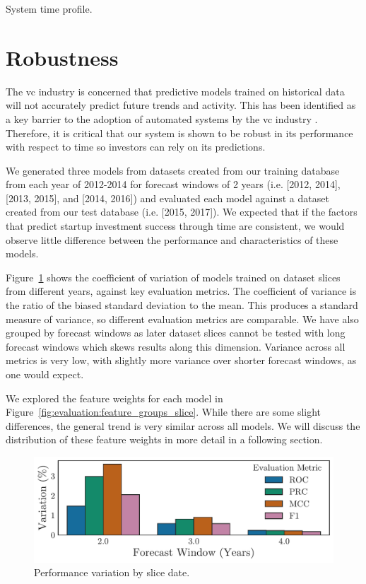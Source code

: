 \documentclass[../thesis/thesis.tex]{subfiles}
\begin{document}
\begin{table}[!htb]
    \centering
    \scalebox{0.9}{}
    \caption[System time profile]{System time profile.}
    \label{tab:evaluation:time_profile}
\end{table}

\section{Robustness}

The \gls{vc} industry is concerned that predictive models trained on historical data will not accurately predict future trends and activity. This  has been identified as a key barrier to the adoption of automated systems by the \gls{vc} industry \cite{stone2014}. Therefore, it is critical that our system is shown to be robust in its performance with respect to time so investors can rely on its predictions.

We generated three models from datasets created from our training database from each year of 2012-2014 for forecast windows of 2 years (i.e. [2012, 2014], [2013, 2015], and [2014, 2016]) and evaluated each model against a dataset created from our test database (i.e. [2015, 2017]). We expected that if the factors that predict startup investment success through time are consistent, we would observe little difference between the performance and characteristics of these models.

Figure~\ref{fig:evaluation:f1_robustness_slice} shows the coefficient of variation of models trained on dataset slices from different years, against key evaluation metrics. The coefficient of variance is the ratio of the biased standard deviation to the mean. This produces a standard measure of variance, so different evaluation metrics are comparable. We have also grouped by forecast windows as later dataset slices cannot be tested with long forecast windows which skews results along this dimension. Variance across all metrics is very low, with slightly more variance over shorter forecast windows, as one would expect.

We explored the feature weights for each model in Figure~\ref{fig:evaluation:feature_groups_slice}. While there are some slight differences, the general trend is very similar across all models. We will discuss the distribution of these feature weights in more detail in a following section.

\begin{figure}[!htb]
    \centering
    \includegraphics[width=\textwidth]{../figures/evaluation/performance_slice}
    \caption[Performance variation by slice date]{Performance variation by slice date.}
    \label{fig:evaluation:f1_robustness_slice}
\end{figure}
\end{document}
